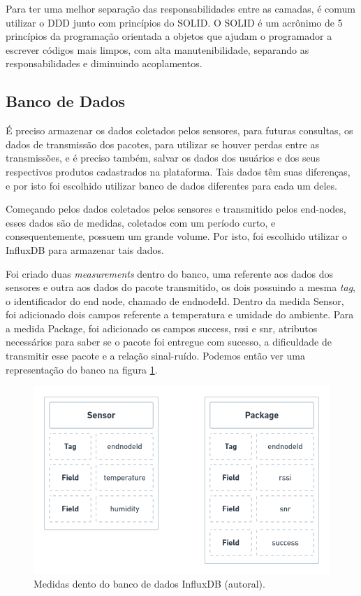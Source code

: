 Para ter uma melhor separação das responsabilidades entre as camadas, é comum utilizar o DDD junto com princípios do SOLID. O SOLID é um acrônimo de 5 princípios da programação orientada a objetos que ajudam o programador a escrever códigos mais limpos, com alta manutenibilidade, separando as responsabilidades e diminuindo acoplamentos.

\subsection{Banco de Dados}
\label{metod:servidor:db}
É preciso armazenar os dados coletados pelos sensores, para futuras consultas, os dados de transmissão dos pacotes, para utilizar se houver perdas entre as transmissões, e é preciso também, salvar os dados dos usuários e dos seus respectivos produtos cadastrados na plataforma. Tais dados têm suas diferenças, e por isto foi escolhido utilizar banco de dados diferentes para cada um deles.
	
Começando pelos dados coletados pelos sensores e transmitido pelos end-nodes, esses dados são de medidas, coletados com um período curto, e consequentemente, possuem um grande volume. Por isto, foi escolhido utilizar o InfluxDB para armazenar tais dados.

Foi criado duas \textit{measurements} dentro do banco, uma referente aos dados dos sensores e outra aos dados do pacote transmitido, os dois possuindo a mesma  \textit{tag}, o identificador do end node, chamado de endnodeId. Dentro da medida Sensor, foi adicionado dois campos referente a temperatura e umidade do ambiente. Para a medida Package, foi adicionado os campos success, rssi e snr, atributos necessários para saber se o pacote foi entregue com sucesso, a dificuldade de transmitir esse pacote e a relação sinal-ruído. Podemos então ver uma representação do banco na figura \ref{fig:influxdb-model}.

\begin{figure}[H]
  \centering
  \includegraphics[width=.80\textwidth]{assets/influx-model.png} 
  \caption{Medidas dento do banco de dados InfluxDB (autoral).}
  \label{fig:influxdb-model} 
\end{figure}

